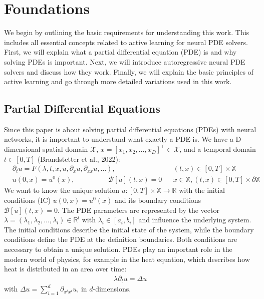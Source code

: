 \chapter{Foundations}\label{chap:k2}
We begin by outlining the basic requirements for understanding this work. This includes all essential concepts related to active learning for neural PDE solvers. First, we will explain what a partial differential equation (PDE) is and why solving PDEs is important. Next, we will introduce autoregressive neural PDE solvers and discuss how they work. Finally, we will explain the basic principles of active learning and go through more detailed variations used in this work.
\section{Partial Differential Equations}
Since this paper is about solving partial differential equations (PDEs) with neural networks, it is important to understand what exactly a PDE is. 
We have a D-dimensional spatial domain $\mathcal{X}$, $x = [x_1,x_2,\dots,x_D]^\top \in \mathcal{X}$, and a temporal domain $t\in[0, T]$ (Brandstetter et al., 2022):
\begin{align} 
    &\partial_t u = F(\lambda,t,x,u,\partial_xu,\partial_{xx}u,\dots), && (t,x)\in[0,T]\times \mathbb{X} \\ &u(0,x)=u^0(x),\hspace{2cm}\mathcal{B}[u](t,x)=0 && x\in\mathbb{X}, (t,x)\in[0,T]\times\partial\mathbb{X} 
\end{align}
We want to know the unique solution $u: [0,T]\times\mathbb{X}\rightarrow\mathbb{R}$ with the initial conditions (IC) $u(0,x)=u^0(x)$ and its boundary conditions $\mathcal{B}[u](t,x)=0$. The PDE parameters are represented by the vector $\lambda = (\lambda_1, \lambda_2,\dots, \lambda_l) \in\mathbb{R}^l$ with $\lambda_i\in[a_i, b_i]$ and influence the underlying system. 
The initial conditions describe the initial state of the system, while the boundary conditions define the PDE at the definition boundaries. 
Both conditions are necessary to obtain a unique solution.
PDEs play an important role in the modern world of physics, for example in the heat equation, which describes how heat is distributed in an area over time:
\begin{align} 
    \lambda\partial_tu=\Delta u 
\end{align} 
with $\Delta u = \sum^d_{i=1}\partial_{x^ix^i}u$, in $d$-dimensions.

